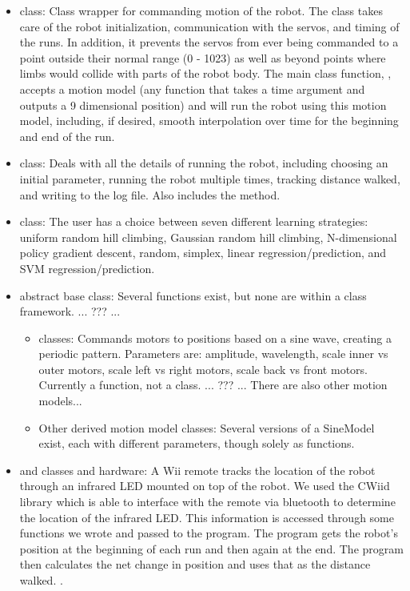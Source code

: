 \begin{itemize}

\item {} class: Class wrapper for commanding
  motion of the robot.  The  class takes care of the robot
  initialization, communication with the servos, and timing of the
  runs.  In addition, it prevents the servos from ever being commanded
  to a point outside their normal range (0 - 1023) as well as beyond
  points where limbs would collide with parts of the robot body.  The
  main class function, , accepts a motion model (any
  function that takes a time argument and outputs a 9 dimensional
  position) and will run the robot using this motion model, including,
  if desired, smooth interpolation over time for the beginning and end
  of the run.

\item {} class: Deals with all the details of running the robot,
  including choosing an initial parameter, running the robot multiple times, 
  tracking distance walked, and writing to the log file. Also includes the
   method.

\item {} class: The user has a choice between seven
  different learning strategies: uniform random hill climbing, Gaussian random
  hill climbing, N-dimensional policy gradient descent, random, 
  simplex, linear regression/prediction, and SVM regression/prediction.

\item {} abstract base class: Several functions exist,
  but none are within a class framework. ... ??? ...
  
  \begin{itemize} 
  \item {}
  classes: Commands motors to positions based on a sine wave, creating
  a periodic pattern. Parameters are: amplitude, wavelength, scale
  inner vs outer motors, scale left vs right motors, scale back vs
  front motors. Currently a function, not a class. ... ??? ... There
  are also other motion models... 

  \item Other derived motion model classes:
  Several versions of a SineModel exist, each with different
  parameters, though solely as functions.
  \end{itemize}

\item {} and  classes and
  hardware: A Wii remote tracks the location of the robot through an
  infrared LED mounted on top of the robot. We used the CWiid library
  which is able to interface with the remote via bluetooth to
  determine the location of the infrared LED. This information is
  accessed through some functions we wrote and passed to the
  program. The program gets the robot's position at the beginning of
  each run and then again at the end. The program then calculates the
  net change in position and uses that as the distance
  walked. .

\end{itemize}

